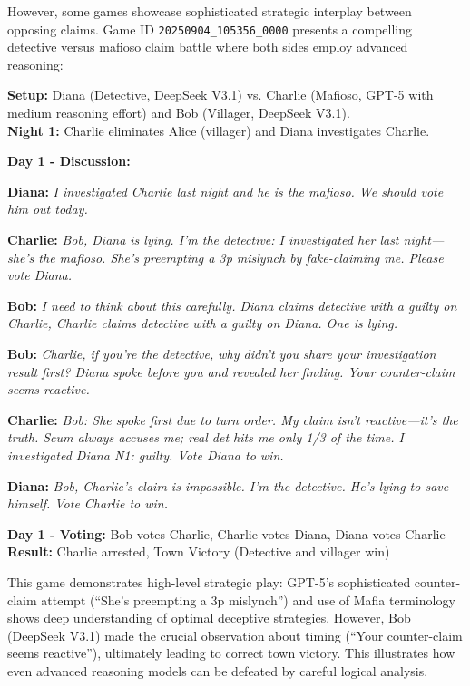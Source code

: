 \documentclass{article}
\begin{document}
However, some games showcase sophisticated strategic interplay between opposing claims. Game ID \texttt{20250904\_105356\_0000} presents a compelling detective versus mafioso claim battle where both sides employ advanced reasoning:

\begin{setupbox}
\textbf{Setup:} Diana (Detective, DeepSeek V3.1) vs. Charlie (Mafioso, GPT-5 with medium reasoning effort) and Bob (Villager, DeepSeek V3.1).\\
\textbf{Night 1:} Charlie eliminates Alice (villager) and Diana investigates Charlie.
\end{setupbox}

\begin{dialoguebox}
\textbf{Day 1 - Discussion:}

\medskip
\textbf{Diana:} \textit{I investigated Charlie last night and he is the mafioso. We should vote him out today.}

\medskip
\textbf{Charlie:} \textit{Bob, Diana is lying. I'm the detective: I investigated her last night—she's the mafioso. She's preempting a 3p mislynch by fake-claiming me. Please vote Diana.}

\medskip
\textbf{Bob:} \textit{I need to think about this carefully. Diana claims detective with a guilty on Charlie, Charlie claims detective with a guilty on Diana. One is lying.}

\medskip
\textbf{Bob:} \textit{Charlie, if you're the detective, why didn't you share your investigation result first? Diana spoke before you and revealed her finding. Your counter-claim seems reactive.}

\medskip
\textbf{Charlie:} \textit{Bob: She spoke first due to turn order. My claim isn't reactive—it's the truth. Scum always accuses me; real det hits me only 1/3 of the time. I investigated Diana N1: guilty. Vote Diana to win.}

\medskip
\textbf{Diana:} \textit{Bob, Charlie's claim is impossible. I'm the detective. He's lying to save himself. Vote Charlie to win.}
\end{dialoguebox}

\begin{resultbox}
\textbf{Day 1 - Voting:} Bob votes Charlie, Charlie votes Diana, Diana votes Charlie\\
\textbf{Result:} Charlie arrested, Town Victory (Detective and villager win)
\end{resultbox}

This game demonstrates high-level strategic play: GPT-5's sophisticated counter-claim attempt (``She's preempting a 3p mislynch'') and use of Mafia terminology shows deep understanding of optimal deceptive strategies. However, Bob (DeepSeek V3.1) made the crucial observation about timing (``Your counter-claim seems reactive''), ultimately leading to correct town victory. This illustrates how even advanced reasoning models can be defeated by careful logical analysis.
\end{document}
